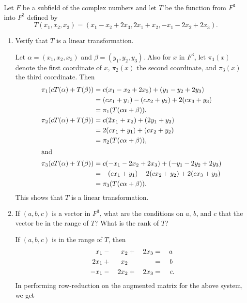  Let $F$ be a subfield of the complex numbers and let $T$ be
the function from $F^3$ into $F^3$ defined by
\begin{equation*}
  T(x_1, x_2, x_3) = (x_1 - x_2 + 2x_3, 2x_1 + x_2, -x_1 - 2x_2 + 2x_3).
\end{equation*}
\begin{enumerate}
\item Verify that $T$ is a linear transformation.
  \begin{solution}
    Let $\alpha = (x_1,x_2,x_3)$ and $\beta = (y_1,y_2,y_3)$. Also for
    $x$ in $F^3$, let $\pi_1(x)$ denote the first coordinate of $x$,
    $\pi_2(x)$ the second coordinate, and $\pi_3(x)$ the third
    coordinate. Then
    \begin{align*}
      \pi_1(cT(\alpha) + T(\beta))
      &= c(x_1 - x_2 + 2x_3) + (y_1 - y_2 + 2y_3) \\
      &= (cx_1 + y_1) - (cx_2 + y_2) + 2(cx_3 + y_3) \\
      &= \pi_1(T(c\alpha + \beta)), \\
      \pi_2(cT(\alpha) + T(\beta))
      &= c(2x_1 + x_2) + (2y_1 + y_2) \\
      &= 2(cx_1 + y_1) + (cx_2 + y_2) \\
      &= \pi_2(T(c\alpha + \beta)), \\
      \intertext{and}
      \pi_3(cT(\alpha) + T(\beta))
      &= c(-x_1 - 2x_2 + 2x_3) + (-y_1 - 2y_2 + 2y_3) \\
      &= -(cx_1 + y_1) - 2(cx_2 + y_2) + 2(cx_3 + y_3) \\
      &= \pi_3(T(c\alpha + \beta)).
    \end{align*}
    This shows that $T$ is a linear transformation.
  \end{solution}
\item If $(a, b, c)$ is a vector in $F^3$, what are the conditions on
  $a$, $b$, and $c$ that the vector be in the range of $T$? What is
  the rank of $T$?
  \begin{solution}
    If $(a, b, c)$ is in the range of $T$, then
    \begin{alignat*}{4}
      x_1 &{}-{}& x_2 &{}+{}& 2x_3 &{}={}& a \\
      2x_1 &{}+{}& x_2 && &{}={}& b \\
      -x_1 &{}-{}& 2x_2 &{}+{}& 2x_3 &{}={}& c\rlap.
    \end{alignat*}
    In performing row-reduction on the augmented matrix for the above
    system, we get
    \begin{equation*}

\end{equation*}
\end{solution}
\end{enumerate}

